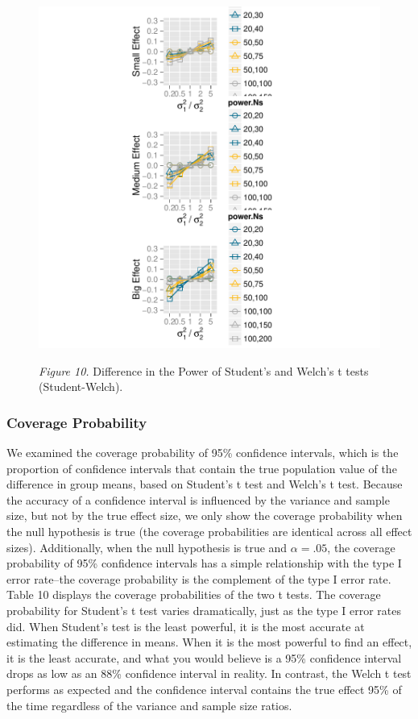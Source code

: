 \documentclass[man,a4paper,noextraspace,apacite]{apa6}
\begin{document}
\begin{figure}
\includegraphics{WelchManuscript-abridged-plotPowerDiff}

\textit{Figure 10.} Difference in the Power of Student's and Welch's t tests (Student-Welch).
\end{figure}

\subsubsection{Coverage Probability}
We examined the coverage probability of 95\% confidence intervals, which is the proportion of confidence intervals that contain the true population value of the difference in group means, based on Student's t test and Welch's t test. Because the accuracy of a confidence interval is influenced by the variance and sample size, but not by the true effect size, we only show the coverage probability when the null hypothesis is true (the coverage probabilities are identical across all effect sizes). Additionally, when the null hypothesis is true and $\alpha = .05$, the coverage probability of 95\% confidence intervals has a simple relationship with the type I error rate--the coverage probability is the complement of the type I error rate. Table 10 displays the coverage probabilities of the two t tests. The coverage probability for Student's t test varies dramatically, just as the type I error rates did. When Student's test is the least powerful, it is the most accurate at estimating the difference in means. When it is the most powerful to find an effect, it is the least accurate, and what you would believe is a 95\% confidence interval drops as low as an 88\% confidence interval in reality. In contrast, the Welch t test performs as expected and the confidence interval contains the true effect 95\% of the time regardless of the variance and sample size ratios. 
\end{document}
